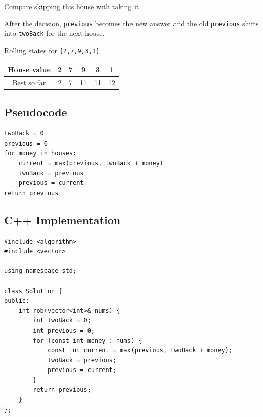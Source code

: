 \begin{visualbox}{Compare skipping this house with taking it}
\centering
{}

\smallskip
After the decision, \texttt{previous} becomes the new answer and the old
\texttt{previous} shifts into \texttt{twoBack} for the next house.
\end{visualbox}

\begin{dryrunbox}{Rolling states for \texttt{[2,7,9,3,1]}}
\begin{center}
\begin{tabular}{c|ccccc}
House value & 2 & 7 & 9 & 3 & 1 \\ \hline
Best so far & 2 & 7 & 11 & 11 & 12
\end{tabular}
\end{center}
\end{dryrunbox}

\subsection{Pseudocode}
\begin{lstlisting}[style=pseudocode]
twoBack = 0
previous = 0
for money in houses:
    current = max(previous, twoBack + money)
    twoBack = previous
    previous = current
return previous
\end{lstlisting}

\subsection{C++ Implementation}
\begin{lstlisting}[style=compactcode,caption={Complete C++ solution: House Robber}]
#include <algorithm>
#include <vector>

using namespace std;

class Solution {
public:
    int rob(vector<int>& nums) {
        int twoBack = 0;
        int previous = 0;
        for (const int money : nums) {
            const int current = max(previous, twoBack + money);
            twoBack = previous;
            previous = current;
        }
        return previous;
    }
};
\end{lstlisting}


